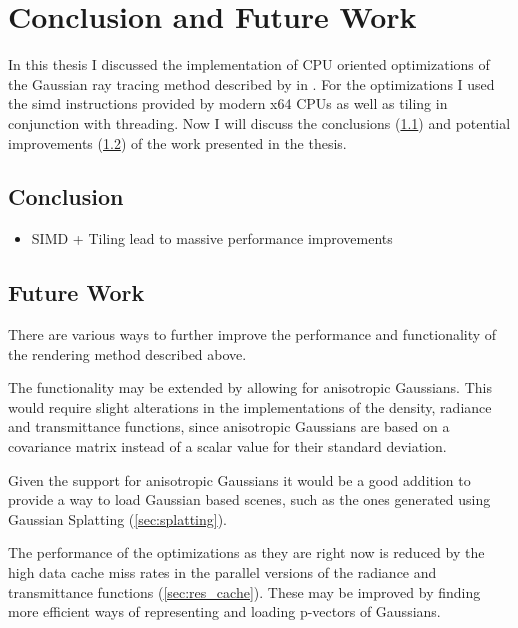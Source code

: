 \documentclass[a4paper, 11pt]{memoir}
\begin{document}
    \chapter{Conclusion and Future Work}
    In this thesis I discussed the implementation of CPU oriented optimizations of the Gaussian ray tracing method described
    by \citeauthor{Rhodin:2015} in \cite{Rhodin:2015}. For the optimizations I used the \gls{simd} instructions provided
    by modern x64 CPUs as well as tiling in conjunction with threading. Now I will discuss the conclusions (\ref{sec:conclusions})
    and potential improvements (\ref{sec:future_work}) of the work presented in the thesis.

    \section{Conclusion}
    \label{sec:conclusions}
    \begin{itemize}
        \item SIMD + Tiling lead to massive performance improvements
    \end{itemize}

    \section{Future Work}
    \label{sec:future_work}
    There are various ways to further improve the performance and functionality of the rendering method described above.

    The functionality may be extended by allowing for anisotropic Gaussians. This would require slight alterations in the
    implementations of the density, \gls{radiance} and \gls{transmittance} functions, since anisotropic Gaussians are
    based on a covariance matrix instead of a scalar value for their standard deviation.

    Given the support for anisotropic Gaussians it would be a good addition to provide a way to load Gaussian based scenes,
    such as the ones generated using Gaussian Splatting (\ref{sec:splatting}).

    The performance of the optimizations as they are right now is reduced by the high data cache miss rates in the parallel
    versions of the \gls{radiance} and \gls{transmittance} functions (\ref{sec:res_cache}). These may be improved by
    finding more efficient ways of representing and loading p-vectors of Gaussians.
\end{document}
